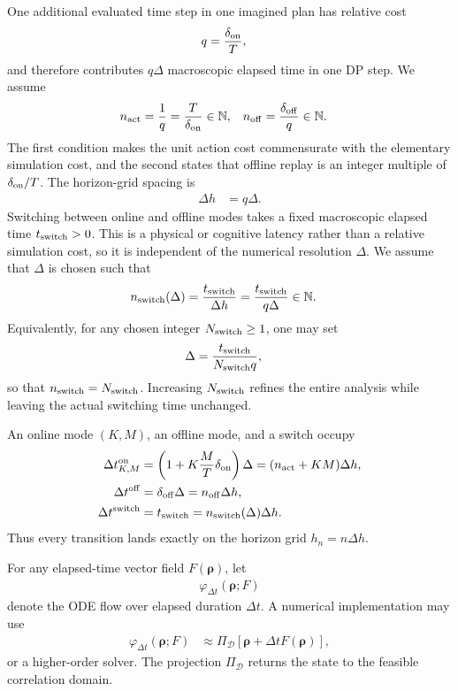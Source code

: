 \documentclass{article}
\begin{document}
One additional evaluated time step in one imagined plan has relative cost
\begin{align}
q &= \frac{\delta_{\rm on}}{T},
\end{align}
and therefore contributes $q\Delta$ macroscopic elapsed time in one DP step. We assume
\begin{align}
n_{\rm act} &= \frac{1}{q}=\frac{T}{\delta_{\rm on}}\in\mathbb N, & n_{\rm off} &= \frac{\delta_{\rm off}}{q}\in\mathbb N.
\end{align}
The first condition makes the unit action cost commensurate with the elementary simulation cost, and the second states that offline replay is an integer multiple of $\delta_{\rm on}/T$. The horizon-grid spacing is
\begin{align}
\Delta h &= q\Delta.
\end{align}
Switching between online and offline modes takes a fixed macroscopic elapsed time $t_{\rm switch}>0$. This is a physical or cognitive latency rather than a relative simulation cost, so it is independent of the numerical resolution $\Delta$. We assume that $\Delta$ is chosen such that
\begin{align}
n_{\rm switch}(\Delta) &= \frac{t_{\rm switch}}{\Delta h}=\frac{t_{\rm switch}}{q\Delta}\in\mathbb N.
\end{align}
Equivalently, for any chosen integer $N_{\rm switch}\geq1$, one may set
\begin{align}
\Delta &= \frac{t_{\rm switch}}{N_{\rm switch}q},
\end{align}
so that $n_{\rm switch}=N_{\rm switch}$. Increasing $N_{\rm switch}$ refines the entire analysis while leaving the actual switching time unchanged.

An online mode $(K,M)$, an offline mode, and a switch occupy
\begin{align}
\Delta t_{K,M}^{\rm on} &= \left(1+K\frac{M}{T}\delta_{\rm on}\right)\Delta=(n_{\rm act}+KM)\Delta h, \\
\Delta t^{\rm off} &= \delta_{\rm off}\Delta=n_{\rm off}\Delta h, \\
\Delta t^{\rm switch} &= t_{\rm switch}=n_{\rm switch}(\Delta)\Delta h.
\end{align}
Thus every transition lands exactly on the horizon grid $h_n=n\Delta h$.

For any elapsed-time vector field $F(\boldsymbol\rho)$, let
\begin{align}
\varphi_{\Delta t}(\boldsymbol\rho;F)
\end{align}
denote the ODE flow over elapsed duration $\Delta t$. A numerical implementation may use
\begin{align}
\varphi_{\Delta t}(\boldsymbol\rho;F) &\approx \Pi_{\mathcal D}\left[\boldsymbol\rho+\Delta tF(\boldsymbol\rho)\right],
\end{align}
or a higher-order solver. The projection $\Pi_{\mathcal D}$ returns the state to the feasible correlation domain.
\end{document}
